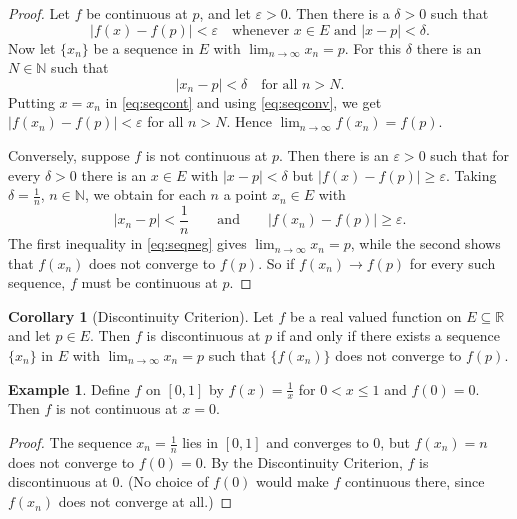 \documentclass[11pt,a4paper]{article}
\numberwithin{equation}{section}
\theoremstyle{definition}
\newtheorem{exa}[thm]{Example}
\newtheorem{coro}[thm]{Corollary}
\begin{document}
\begin{proof}
Let $f$ be continuous at $p$, and let $\varepsilon > 0$. Then there is a $\delta > 0$ such that
\begin{equation}\label{eq:seqcont}
|f(x)  - f(p)| < \varepsilon \quad\text{whenever } x\in E \text{ and } |x - p| < \delta.
\end{equation}
Now let $\{x_n\}$ be a sequence in $E$ with $\lim_{n\rightarrow \infty} x_n = p$. For this $\delta$ there is an $N\in \mathbb{N}$ such that
\begin{equation}\label{eq:seqconv}
|x_n - p| < \delta \quad\text{for all } n > N.
\end{equation}
Putting $x= x_n$ in \eqref{eq:seqcont} and using \eqref{eq:seqconv}, we get $|f(x_n) - f(p)| < \varepsilon$ for all $n > N$. Hence $\lim_{n\rightarrow \infty} f(x_n) = f(p)$.

Conversely, suppose $f$ is not continuous at $p$. Then there is an $\varepsilon > 0$ such that for every $\delta > 0$ there is an $x\in E$ with $|x - p| < \delta$ but $|f(x) - f(p)|\geq \varepsilon$. Taking $\delta = \frac{1}{n}$, $n\in \mathbb{N}$, we obtain for each $n$ a point $x_n\in E$ with
\begin{equation}\label{eq:seqneg}
|x_n - p| < \frac{1}{n} \qquad\text{and}\qquad |f(x_n) - f(p)|\geq \varepsilon .
\end{equation}
The first inequality in \eqref{eq:seqneg} gives $\lim_{n\rightarrow \infty} x_n = p$, while the second shows that $f(x_n)$ does not converge to $f(p)$. So if $f(x_n)\longrightarrow f(p)$ for every such sequence, $f$ must be continuous at $p$.
\end{proof}


\begin{coro}[Discontinuity Criterion]
Let $f$ be a real valued function on $E\subseteq \mathbb{R}$ and let $p\in E$. Then $f$ is discontinuous at $p$ if and only if there exists a sequence $\{x_n\}$ in $E$ with $\lim_{n\rightarrow \infty} x_n = p$ such that $\{f(x_n)\}$ does not converge to $f(p)$.
\end{coro}


\begin{exa}
Define $f$ on $[0,1]$ by $f(x) = \frac{1}{x}$ for $0<x\leq 1$ and $f(0) = 0$. Then $f$ is not continuous at $x=0$.
\end{exa}

\begin{proof}
The sequence $x_n = \frac{1}{n}$ lies in $[0,1]$ and converges to $0$, but $f(x_n) = n$ does not converge to $f(0) = 0$. By the Discontinuity Criterion, $f$ is discontinuous at $0$. (No choice of $f(0)$ would make $f$ continuous there, since $f(x_n)$ does not converge at all.)
\end{proof}
\end{document}
